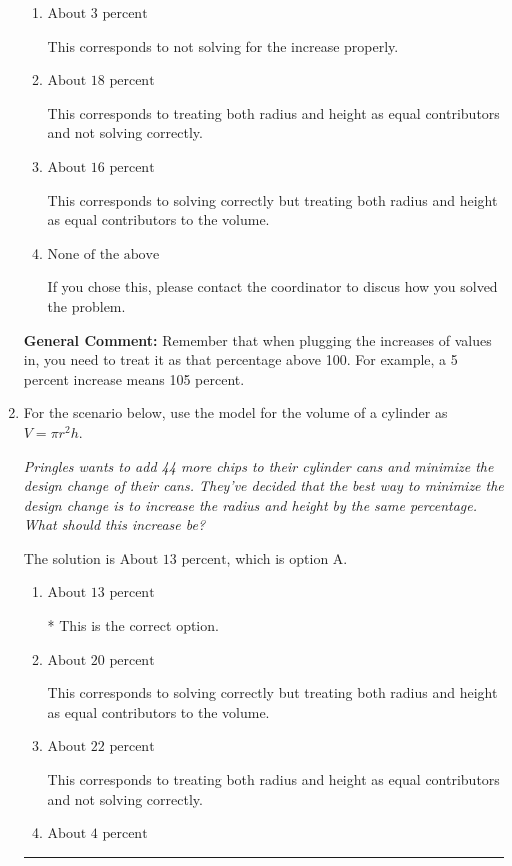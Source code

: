 \documentclass{extbook}[14pt]
\newcommand{\litem}[1]{\item #1

\rule{\textwidth}{0.4pt}}
\begin{document}
\begin{enumerate}
{\begin{enumerate}[label=\Alph*.]
* This is the correct option.
\item \( \text{About } 3 \text{ percent} \)

This corresponds to not solving for the increase properly.
\item \( \text{About } 18 \text{ percent} \)

This corresponds to treating both radius and height as equal contributors and not solving correctly.
\item \( \text{About } 16 \text{ percent} \)

This corresponds to solving correctly but treating both radius and height as equal contributors to the volume.
\item \( \text{None of the above} \)

If you chose this, please contact the coordinator to discus how you solved the problem.
\end{enumerate}

\textbf{General Comment:} Remember that when plugging the increases of values in, you need to treat it as that percentage above 100. For example, a 5 percent increase means 105 percent.
}
\litem{
For the scenario below, use the model for the volume of a cylinder as $V = \pi r^2 h$.

\begin{center}
    \textit{ Pringles wants to add 44 \text{percent} more chips to their cylinder cans and minimize the design change of their cans. They've decided that the best way to minimize the design change is to increase the radius and height by the same percentage. What should this increase be? }
\end{center}


The solution is \( \text{About } 13 \text{ percent} \), which is option A.\begin{enumerate}[label=\Alph*.]
\item \( \text{About } 13 \text{ percent} \)

* This is the correct option.
\item \( \text{About } 20 \text{ percent} \)

This corresponds to solving correctly but treating both radius and height as equal contributors to the volume.
\item \( \text{About } 22 \text{ percent} \)

This corresponds to treating both radius and height as equal contributors and not solving correctly.
\item \( \text{About } 4 \text{ percent} \)


\end{enumerate}}
\end{enumerate}
\end{document}
